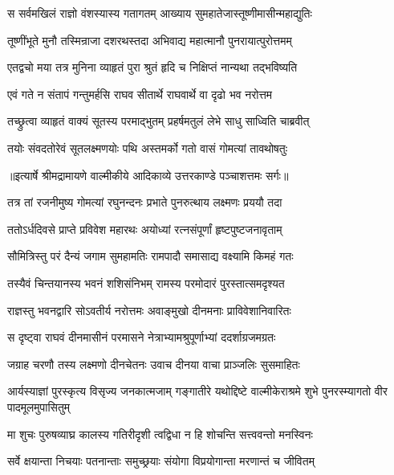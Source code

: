 \twolineshloka
{स सर्वमखिलं राज्ञो वंशस्यास्य गतागतम्}
{आख्याय सुमहातेजास्तूष्णीमासीन्महाद्युतिः} %

\twolineshloka
{तूष्णींभूते मुनौ तस्मिन्राजा दशरथस्तदा}
{अभिवाद्य महात्मानौ पुनरायात्पुरोत्तमम्} %

\twolineshloka
{एतद्वचो मया तत्र मुनिना व्याहृतं पुरा}
{श्रुतं हृदि च निक्षिप्तं नान्यथा तद्भविष्यति} %

\twolineshloka
{एवं गते न संतापं गन्तुमर्हसि राघव}
{सीतार्थे राघवार्थे वा दृढो भव नरोत्तम} %

\twolineshloka
{तच्छ्रुत्वा व्याहृतं वाक्यं सूतस्य परमाद्भुतम्}
{प्रहर्षमतुलं लेभे साधु साध्विति चाब्रवीत्} %

\twolineshloka
{तयोः संवदतोरेवं सूतलक्ष्मणयोः पथि}
{अस्तमर्को गतो वासं गोमत्यां तावथोषतुः} %


{॥इत्यार्षे श्रीमद्रामायणे वाल्मीकीये आदिकाव्ये उत्तरकाण्डे पञ्चाशत्तमः सर्गः॥}


\twolineshloka
{तत्र तां रजनीमुष्य गोमत्यां रघुनन्दनः}
{प्रभाते पुनरुत्थाय लक्ष्मणः प्रययौ तदा} %

\twolineshloka
{ततोऽर्धदिवसे प्राप्ते प्रविवेश महारथः}
{अयोध्यां रत्नसंपूर्णां हृष्टपुष्टजनावृताम्} %

\twolineshloka
{सौमित्रिस्तु परं दैन्यं जगाम सुमहामतिः}
{रामपादौ समासाद्य वक्ष्यामि किमहं गतः} %

\twolineshloka
{तस्यैवं चिन्तयानस्य भवनं शशिसंनिभम्}
{रामस्य परमोदारं पुरस्तात्समदृश्यत} %

\twolineshloka
{राज्ञस्तु भवनद्वारि सोऽवतीर्य नरोत्तमः}
{अवाङ्मुखो दीनमनाः प्राविवेशानिवारितः} %

\twolineshloka
{स दृष्ट्वा राघवं दीनमासीनं परमासने}
{नेत्राभ्यामश्रुपूर्णाभ्यां ददर्शाग्रजमग्रतः} %

\twolineshloka
{जग्राह चरणौ तस्य लक्ष्मणो दीनचेतनः}
{उवाच दीनया वाचा प्राञ्जलिः सुसमाहितः} %

\threelineshloka
{आर्यस्याज्ञां पुरस्कृत्य विसृज्य जनकात्मजाम्}
{गङ्गातीरे यथोद्दिष्टे वाल्मीकेराश्रमे शुभे}
{पुनरस्म्यागतो वीर पादमूलमुपासितुम्} %

\twolineshloka
{मा शुचः पुरुषव्याघ्र कालस्य गतिरीदृशी}
{त्वद्विधा न हि शोचन्ति सत्त्ववन्तो मनस्विनः} %

\twolineshloka
{सर्वे क्षयान्ता निचयाः पतनान्ताः समुच्छ्रयाः}
{संयोगा विप्रयोगान्ता मरणान्तं च जीवितम्} %

